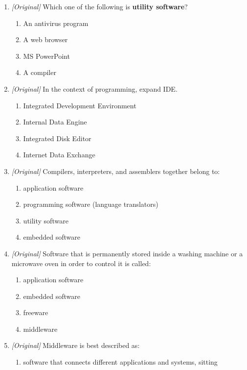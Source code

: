 \documentclass[11pt]{article}
\begin{document}
\begin{enumerate}[label=\textbf{Q\arabic*.}, leftmargin=*]
\begin{enumerate}[label=\Alph*.]
    \item The BIOS
  \end{enumerate}
\item \textit{[Original]} Which one of the following is \textbf{utility
  software}?
  \begin{enumerate}[label=\Alph*.]
    \item An antivirus program
    \item A web browser
    \item MS PowerPoint
    \item A compiler
  \end{enumerate}
\item \textit{[Original]} In the context of programming, expand IDE.
  \begin{enumerate}[label=\Alph*.]
    \item Integrated Development Environment
    \item Internal Data Engine
    \item Integrated Disk Editor
    \item Internet Data Exchange
  \end{enumerate}
\item \textit{[Original]} Compilers, interpreters, and assemblers together
  belong to:
  \begin{enumerate}[label=\Alph*.]
    \item application software
    \item programming software (language translators)
    \item utility software
    \item embedded software
  \end{enumerate}
\item \textit{[Original]} Software that is permanently stored inside a washing
  machine or a microwave oven in order to control it is called:
  \begin{enumerate}[label=\Alph*.]
    \item application software
    \item embedded software
    \item freeware
    \item middleware
  \end{enumerate}
\item \textit{[Original]} Middleware is best described as:
  \begin{enumerate}[label=\Alph*.]
    \item software that connects different applications and systems, sitting

\end{enumerate}
\end{enumerate}
\end{document}
